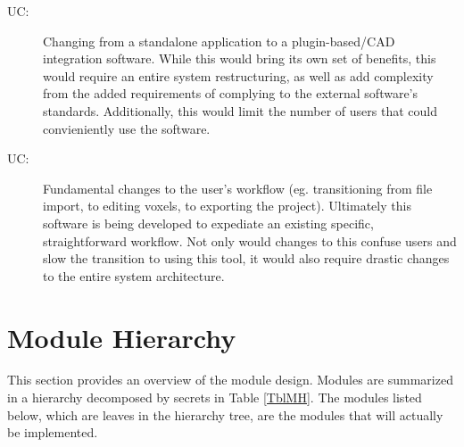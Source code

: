 \documentclass[12pt, titlepage]{article}
\newcounter{ucnum}
\newcommand{\uctheucnum}{UC\theucnum}
\begin{document}
\begin{description}
\item[ \uctheucnum\label{ucStandalone}:] Changing from a standalone application to a plugin-based/CAD integration software. While this would bring its own set of benefits, this would require an entire system restructuring, as well as add complexity from the added requirements of complying to the external software's standards. Additionally, this would limit the number of users that could convieniently use the software.

\item[ \uctheucnum\label{ucWorkflow}:] Fundamental changes to the user's workflow (eg. transitioning from file import, to editing voxels, to exporting the project). Ultimately this software is being developed to expediate an existing specific, straightforward workflow. Not only would changes to this confuse users and slow the transition to using this tool, it would also require drastic changes to the entire system architecture. 

\end{description}

\section{Module Hierarchy} \label{SecMH}

This section provides an overview of the module design. Modules are summarized
in a hierarchy decomposed by secrets in Table \ref{TblMH}. The modules listed
below, which are leaves in the hierarchy tree, are the modules that will
actually be implemented.
\end{document}
